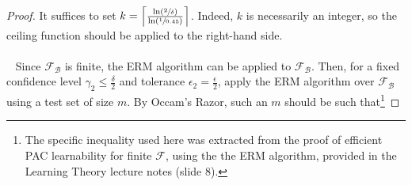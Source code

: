 \documentclass[twoside,11pt]{homework}
\DeclarePairedDelimiter{\2norm}{\lVert}{\rVert^2_2}
\newcommand{\1}[1]{\mathds{1}\left[#1\right]}
\begin{document}
\begin{proof}
\noindent
It suffices to set $k  = \left\lceil\frac{\ln\left(\sfrac{2}{\delta}\right)}{\ln\left(\sfrac{1}{0.45}\right)}\right\rceil$. Indeed, $k$ is necessarily an integer, so the ceiling function should be applied to the right-hand side. %
\\\ \\\
Since $\mathcal{F_{\mathcal{B}}}$ is finite, the ERM algorithm can be applied to $\mathcal{F_{\mathcal{B}}}$. Then, for a fixed confidence level $\gamma_2 \leq \frac{\delta}{2}$ and tolerance $\epsilon_2 = \frac{\epsilon}{2}$, apply the ERM algorithm over $\mathcal{F_{\mathcal{B}}}$ using a test set of size $m$. By Occam's Razor, such an $m$ should be such that\footnote{The specific inequality used here was extracted from the proof of efficient PAC learnability for finite $\mathcal{F}$, using the the ERM algorithm, provided in the Learning Theory lecture notes (slide 8).}

\end{proof}
\end{document}
